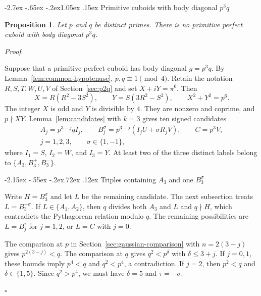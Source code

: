 \documentclass[11pt,a4paper,twoside]{article}
\makeatletter
\numberwithin{equation}{section}
\newcommand{\proseheadingstop}{.}
\newtheorem{proposition}[theorem]{Proposition}
\providecommand{\proofname}{Proof}
\renewcommand{\section}{\@startsection{section}{1}{\z@}%
  {-2.7ex \@plus -.65ex \@minus -.2ex}{1.05ex \@plus .15ex}%
  {\normalfont\large\bfseries}}
\renewcommand{\subsection}{\@startsection{subsection}{2}{\z@}%
  {-2.15ex \@plus -.55ex \@minus -.2ex}{.72ex \@plus .12ex}%
  {\normalfont\normalsize\bfseries}}
\newenvironment{proof}[1][\proofname]{%
  \par\addvspace{.65\baselineskip}\noindent
  \textit{#1}\proseheadingstop\enspace\ignorespaces
}{%
  \unskip\nobreak\hfill\nobreak\(\square\)\par
  \addvspace{.65\baselineskip}
}
\makeatother
\begin{document}
\section{Primitive cuboids with body diagonal \texorpdfstring{\(p^3q\)}{p³q}}
\label{sec:p3q}

\begin{proposition}\label{prop:p3q}
Let \(p\) and \(q\) be distinct primes. There is no primitive perfect cuboid with body diagonal \(p^3q\).
\end{proposition}

\begin{proof}
Suppose that a primitive perfect cuboid has body diagonal \(g=p^3q\). By Lemma~\ref{lem:common-hypotenuse}, \(p,q\equiv1\pmod4\). Retain the notation \(R,S,T,W,U,V\) of Section~\ref{sec:p2q} and set \(X+iY=\pi^6\). Then
\[
X=R(R^2-3S^2),\qquad Y=S(3R^2-S^2),\qquad X^2+Y^2=p^6.
\]
The integer \(X\) is odd and \(Y\) is divisible by \(4\). They are nonzero and coprime, and \(p\nmid XY\). Lemma~\ref{lem:candidates} with \(k=3\) gives ten signed candidates
\[
\begin{gathered}
A_j=p^{3-j}qI_j,\qquad B_j^\sigma=p^{3-j}(I_jU+\sigma R_jV),\qquad C=p^3V,\\
j=1,2,3,\qquad \sigma\in\{1,-1\},
\end{gathered}
\]
where \(I_1=S\), \(I_2=W\), and \(I_3=Y\). At least two of the three distinct labels belong to \(\{A_3,B_3^+,B_3^-\}\).

\subsection{Triples containing \texorpdfstring{\(A_3\)}{A₃} and one \texorpdfstring{\(B_3^\sigma\)}{B₃(σ)}}

Write \(H=B_3^\sigma\) and let \(L\) be the remaining candidate. The next subsection treats \(L=B_3^{-\sigma}\). If \(L\in\{A_1,A_2\}\), then \(q\) divides both \(A_3\) and \(L\) and \(q\nmid H\), which contradicts the Pythagorean relation modulo \(q\). The remaining possibilities are \(L=B_j^\tau\) for \(j=1,2\), or \(L=C\) with \(j=0\).

The comparison at \(p\) in Section~\ref{sec:gaussian-comparison} with \(n=2(3-j)\) gives \(p^{2(3-j)}<q\). The comparison at \(q\) gives \(q^2<p^\delta\) with \(\delta\le3+j\). If \(j=0,1\), these bounds imply \(p^4<q\) and \(q^2<p^4\), a contradiction. If \(j=2\), then \(p^2<q\) and \(\delta\in\{1,5\}\). Since \(q^2>p^4\), we must have \(\delta=5\) and \(\tau=-\sigma\).


\end{proof}
\end{document}
